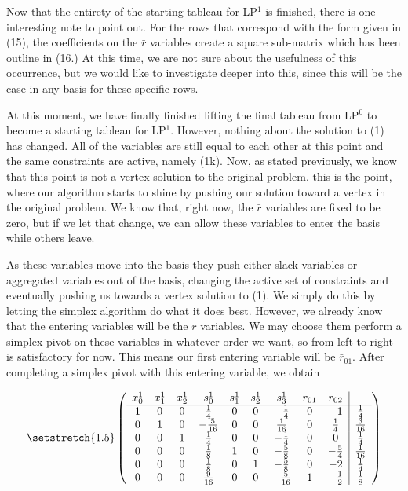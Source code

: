 \documentclass[11pt]{article} %
\begin{document}
	
	Now that the entirety of the starting tableau for LP$^1$ is finished, there is one interesting note to point out.  For the rows that correspond with the form given in (15), the coefficients on the $\bar{r}$ variables create a square sub-matrix which has been outline in (16.)  At this time, we are not sure about the usefulness of this occurrence, but we would like to investigate deeper into this, since this will be the case in any basis for these specific rows. 
	
	At this moment, we have finally finished lifting the final tableau from LP$^0$ to become a starting tableau for LP$^1$.  However, nothing about the solution to (1) has changed.  All of the variables are still equal to each other at this point and the same constraints are active, namely (1k).  Now, as stated previously, we know that this point is not a vertex solution to the original problem.  this is the point, where our algorithm starts to shine by pushing our solution toward a vertex in the original problem.  We know that, right now, the $\bar{r}$ variables are fixed to be zero, but if we let that change, we can allow these variables to enter the basis while others leave.
	
	As these variables move into the basis they push either slack variables or aggregated variables out of the basis, changing the active set of constraints and eventually pushing us towards a vertex solution to (1).  We simply do this by letting the simplex algorithm do what it does best.  However, we already know that the entering variables will be the $\bar{r}$ variables.  We may choose them perform a simplex pivot on these variables in whatever order we want, so from left to right is satisfactory for now.  This means our first entering variable will be $\bar{r}_{01}$.  After completing a simplex pivot with this entering variable, we obtain 
	
	\begin{equation}\setstretch{1.5}
	\begin{pmatrix}
	\begin{array}{ccccccccc|c}
	\bar{x}^1_0 & \bar{x}^1_1 & \bar{x}^1_2 & \bar{s}^1_0 & \bar{s}^1_1 & \bar{s}^1_2 & \bar{s}^1_3 & \bar{r}_{01} & \bar{r}_{02} \\
	\hline
	1 & 0 & 0 & \frac{1}{4} & 0 & 0 & -\frac{1}{4} & 0 & -1 & \frac{1}{4} \\ 
	0 & 1 & 0 & -\frac{5}{16} & 0 & 0 & \frac{1}{16} &  0 & \frac{1}{4} & \frac{3}{16} \\ 
	0 & 0 & 1 & \frac{1}{4} & 0 & 0 & -\frac{1}{4} & 0 & 0 & \frac{1}{4} \\ 
	0 & 0 & 0 & \frac{1}{8} & 1 & 0 & -\frac{5}{8} & 0 & -\frac{5}{4} & \frac{1}{16} \\ 
	0 & 0 & 0 & \frac{1}{8} & 0 & 1 & -\frac{5}{8} & 0 & -2 & \frac{1}{4} \\
	0 & 0 & 0 & \frac{9}{16} & 0 & 0 & -\frac{5}{16} & 1 & -\frac{1}{2} & \frac{1}{8} \\
	\end{array}
	\end{pmatrix}
	\end{equation}
	
\end{document}
